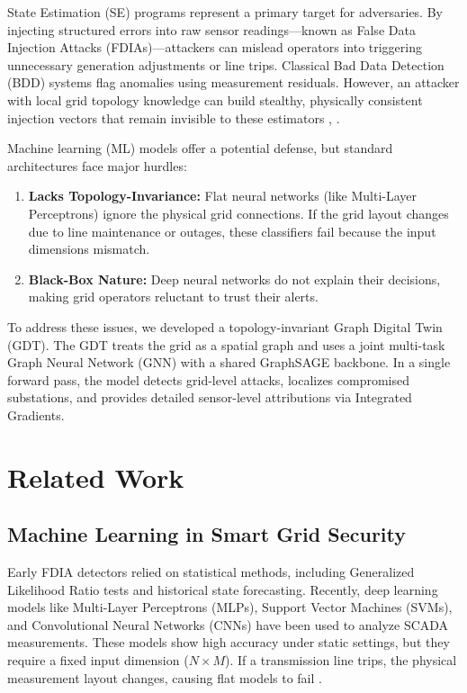 \documentclass[journal]{IEEEtran}
\begin{document}
State Estimation (SE) programs represent a primary target for adversaries. By injecting structured errors into raw sensor readings—known as False Data Injection Attacks (FDIAs)—attackers can mislead operators into triggering unnecessary generation adjustments or line trips. Classical Bad Data Detection (BDD) systems flag anomalies using measurement residuals. However, an attacker with local grid topology knowledge can build stealthy, physically consistent injection vectors that remain invisible to these estimators \cite{b3}, \cite{b4}.

Machine learning (ML) models offer a potential defense, but standard architectures face major hurdles:
\begin{enumerate}
    \item \textbf{Lacks Topology-Invariance:} Flat neural networks (like Multi-Layer Perceptrons) ignore the physical grid connections. If the grid layout changes due to line maintenance or outages, these classifiers fail because the input dimensions mismatch.
    \item \textbf{Black-Box Nature:} Deep neural networks do not explain their decisions, making grid operators reluctant to trust their alerts.
\end{enumerate}

To address these issues, we developed a topology-invariant Graph Digital Twin (GDT). The GDT treats the grid as a spatial graph and uses a joint multi-task Graph Neural Network (GNN) with a shared GraphSAGE backbone. In a single forward pass, the model detects grid-level attacks, localizes compromised substations, and provides detailed sensor-level attributions via Integrated Gradients.

\section{Related Work}

\subsection{Machine Learning in Smart Grid Security}
Early FDIA detectors relied on statistical methods, including Generalized Likelihood Ratio tests and historical state forecasting. Recently, deep learning models like Multi-Layer Perceptrons (MLPs), Support Vector Machines (SVMs), and Convolutional Neural Networks (CNNs) have been used to analyze SCADA measurements. These models show high accuracy under static settings, but they require a fixed input dimension ($N \times M$). If a transmission line trips, the physical measurement layout changes, causing flat models to fail \cite{b5}.
\end{document}

